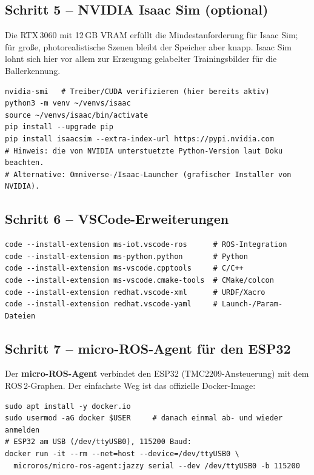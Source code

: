 \subsection{Schritt 5 -- NVIDIA Isaac Sim (optional)}
Die RTX\,3060 mit 12\,GB VRAM erfüllt die Mindestanforderung für Isaac Sim;
für große, photorealistische Szenen bleibt der Speicher aber knapp. Isaac Sim
lohnt sich hier vor allem zur Erzeugung gelabelter Trainingsbilder für die
Ballerkennung.
\begin{lstlisting}[style=bash,caption={Isaac Sim über den pip-Workflow}]
nvidia-smi   # Treiber/CUDA verifizieren (hier bereits aktiv)
python3 -m venv ~/venvs/isaac
source ~/venvs/isaac/bin/activate
pip install --upgrade pip
pip install isaacsim --extra-index-url https://pypi.nvidia.com
# Hinweis: die von NVIDIA unterstuetzte Python-Version laut Doku beachten.
# Alternative: Omniverse-/Isaac-Launcher (grafischer Installer von NVIDIA).
\end{lstlisting}

\subsection{Schritt 6 -- VSCode-Erweiterungen}
\begin{lstlisting}[style=bash,caption={Erweiterungen für ROS\,2-Entwicklung}]
code --install-extension ms-iot.vscode-ros      # ROS-Integration
code --install-extension ms-python.python       # Python
code --install-extension ms-vscode.cpptools     # C/C++
code --install-extension ms-vscode.cmake-tools  # CMake/colcon
code --install-extension redhat.vscode-xml      # URDF/Xacro
code --install-extension redhat.vscode-yaml     # Launch-/Param-Dateien
\end{lstlisting}

\subsection{Schritt 7 -- micro-ROS-Agent für den ESP32}
Der \textbf{micro-ROS-Agent} verbindet den ESP32 (TMC2209-Ansteuerung) mit dem
ROS\,2-Graphen. Der einfachste Weg ist das offizielle Docker-Image:
\begin{lstlisting}[style=bash,caption={micro-ROS-Agent via Docker (serielle Brücke)}]
sudo apt install -y docker.io
sudo usermod -aG docker $USER     # danach einmal ab- und wieder anmelden
# ESP32 am USB (/dev/ttyUSB0), 115200 Baud:
docker run -it --rm --net=host --device=/dev/ttyUSB0 \
  microros/micro-ros-agent:jazzy serial --dev /dev/ttyUSB0 -b 115200
\end{lstlisting}

